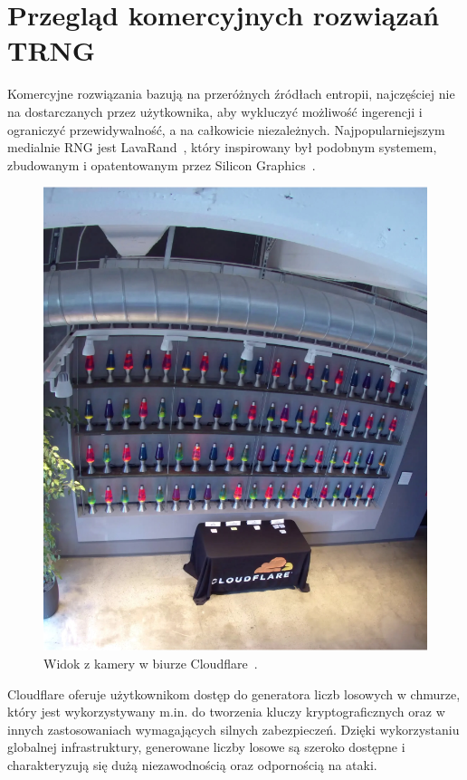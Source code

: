 \section{Przegląd komercyjnych rozwiązań TRNG}\label{sec:przeglad-komercyjnych-rozwiazan-trng}

Komercyjne rozwiązania bazują na przeróżnych źródłach entropii,
najczęściej nie na dostarczanych przez użytkownika, aby wykluczyć możliwość ingerencji i ograniczyć przewidywalność, a na całkowicie niezależnych.
Najpopularniejszym medialnie RNG jest LavaRand~\cite{cloudflare_lavarand}, który inspirowany był podobnym systemem,
zbudowanym i opatentowanym przez Silicon Graphics~\cite{SiliconGraphics}.

\begin{figure}[h]
    \centering
    \includegraphics[width=0.4\linewidth]{chapters/02-teoria/figures/lavarandCamera}
    \caption{Widok z kamery w biurze Cloudflare~\cite{cloudflare_lavarand}.}
    \label{fig:lavarand}
\end{figure}

Cloudflare oferuje użytkownikom dostęp do generatora liczb losowych w chmurze, który jest wykorzystywany
m.in. do tworzenia kluczy kryptograficznych oraz w innych zastosowaniach wymagających silnych zabezpieczeń.
Dzięki wykorzystaniu globalnej infrastruktury, generowane liczby losowe są
szeroko dostępne i charakteryzują się dużą niezawodnością oraz odpornością na ataki.

